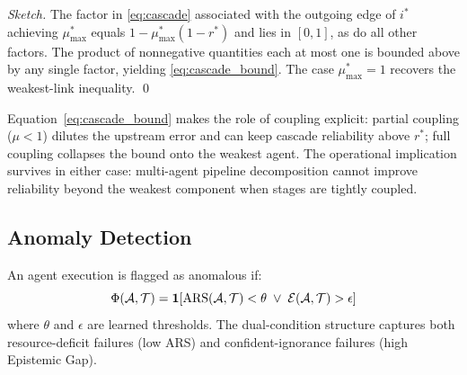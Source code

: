 \begin{proof}[Sketch]
The factor in \eqref{eq:cascade} associated with the outgoing edge of
$i^*$ achieving $\mu^*_{\max}$ equals $1 - \mu^*_{\max}(1 - r^*)$ and
lies in $[0,1]$, as do all other factors. The product of nonnegative
quantities each at most one is bounded above by any single factor,
yielding \eqref{eq:cascade_bound}. The case $\mu^*_{\max} = 1$ recovers
the weakest-link inequality. \qed
\end{proof}

Equation~\eqref{eq:cascade_bound} makes the role of coupling explicit:
partial coupling ($\mu < 1$) dilutes the upstream error and can keep
cascade reliability above $r^*$; full coupling collapses the bound onto
the weakest agent. The operational implication survives in either case:
multi-agent pipeline decomposition cannot improve reliability beyond the
weakest component when stages are tightly coupled.

\subsection{Anomaly Detection}

An agent execution is flagged as anomalous if:
\begin{equation}
  \Phi(\mathcal{A}, \mathcal{T}) = \mathbf{1}\!\left[\mathrm{ARS}(\mathcal{A}, \mathcal{T}) < \theta \;\lor\;
    \mathcal{E}(\mathcal{A}, \mathcal{T}) > \epsilon\right]
  \label{eq:anomaly}
\end{equation}
where $\theta$ and $\epsilon$ are learned thresholds. The dual-condition
structure captures both resource-deficit failures (low ARS) and
confident-ignorance failures (high Epistemic Gap).

